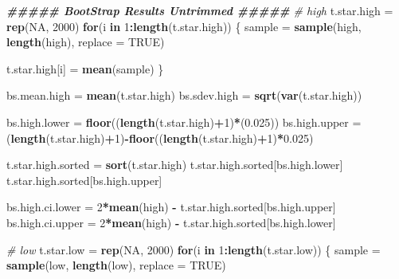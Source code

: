 \documentclass[
]{article}
\newenvironment{Shaded}{\begin{snugshade}}{\end{snugshade}}
\newcommand{\AttributeTok}[1]{\textcolor[rgb]{0.13,0.29,0.53}{#1}}
\newcommand{\CommentTok}[1]{\textcolor[rgb]{0.56,0.35,0.01}{\textit{#1}}}
\newcommand{\ConstantTok}[1]{\textcolor[rgb]{0.56,0.35,0.01}{#1}}
\newcommand{\ControlFlowTok}[1]{\textcolor[rgb]{0.13,0.29,0.53}{\textbf{#1}}}
\newcommand{\DecValTok}[1]{\textcolor[rgb]{0.00,0.00,0.81}{#1}}
\newcommand{\DocumentationTok}[1]{\textcolor[rgb]{0.56,0.35,0.01}{\textbf{\textit{#1}}}}
\newcommand{\FloatTok}[1]{\textcolor[rgb]{0.00,0.00,0.81}{#1}}
\newcommand{\FunctionTok}[1]{\textcolor[rgb]{0.13,0.29,0.53}{\textbf{#1}}}
\newcommand{\NormalTok}[1]{#1}
\newcommand{\OtherTok}[1]{\textcolor[rgb]{0.56,0.35,0.01}{#1}}
\newcommand{\SpecialCharTok}[1]{\textcolor[rgb]{0.81,0.36,0.00}{\textbf{#1}}}
\begin{document}
\begin{Shaded}
\begin{Highlighting}[]
\DocumentationTok{\#\#\#\#\# BootStrap Results Untrimmed \#\#\#\#\#}
\CommentTok{\# high}
\NormalTok{t.star.high }\OtherTok{=} \FunctionTok{rep}\NormalTok{(}\ConstantTok{NA}\NormalTok{, }\DecValTok{2000}\NormalTok{)}
\ControlFlowTok{for}\NormalTok{(i }\ControlFlowTok{in} \DecValTok{1}\SpecialCharTok{:}\FunctionTok{length}\NormalTok{(t.star.high)) \{}
\NormalTok{    sample }\OtherTok{=} \FunctionTok{sample}\NormalTok{(high, }\FunctionTok{length}\NormalTok{(high), }\AttributeTok{replace =} \ConstantTok{TRUE}\NormalTok{)}

\NormalTok{    t.star.high[i] }\OtherTok{=} \FunctionTok{mean}\NormalTok{(sample)}
\NormalTok{\}}

\NormalTok{bs.mean.high }\OtherTok{=} \FunctionTok{mean}\NormalTok{(t.star.high)}
\NormalTok{bs.sdev.high }\OtherTok{=} \FunctionTok{sqrt}\NormalTok{(}\FunctionTok{var}\NormalTok{(t.star.high))}

\NormalTok{bs.high.lower }\OtherTok{=} \FunctionTok{floor}\NormalTok{((}\FunctionTok{length}\NormalTok{(t.star.high)}\SpecialCharTok{+}\DecValTok{1}\NormalTok{)}\SpecialCharTok{*}\NormalTok{(}\FloatTok{0.025}\NormalTok{))}
\NormalTok{bs.high.upper }\OtherTok{=}\NormalTok{ (}\FunctionTok{length}\NormalTok{(t.star.high)}\SpecialCharTok{+}\DecValTok{1}\NormalTok{)}\SpecialCharTok{{-}}\FunctionTok{floor}\NormalTok{((}\FunctionTok{length}\NormalTok{(t.star.high)}\SpecialCharTok{+}\DecValTok{1}\NormalTok{)}\SpecialCharTok{*}\FloatTok{0.025}\NormalTok{)}

\NormalTok{t.star.high.sorted }\OtherTok{=} \FunctionTok{sort}\NormalTok{(t.star.high)}
\NormalTok{t.star.high.sorted[bs.high.lower]}
\NormalTok{t.star.high.sorted[bs.high.upper]}

\NormalTok{bs.high.ci.lower }\OtherTok{=} \DecValTok{2}\SpecialCharTok{*}\FunctionTok{mean}\NormalTok{(high) }\SpecialCharTok{{-}}\NormalTok{ t.star.high.sorted[bs.high.upper]}
\NormalTok{bs.high.ci.upper }\OtherTok{=} \DecValTok{2}\SpecialCharTok{*}\FunctionTok{mean}\NormalTok{(high) }\SpecialCharTok{{-}}\NormalTok{ t.star.high.sorted[bs.high.lower]}

\CommentTok{\# low}
\NormalTok{t.star.low }\OtherTok{=} \FunctionTok{rep}\NormalTok{(}\ConstantTok{NA}\NormalTok{, }\DecValTok{2000}\NormalTok{)}
\ControlFlowTok{for}\NormalTok{(i }\ControlFlowTok{in} \DecValTok{1}\SpecialCharTok{:}\FunctionTok{length}\NormalTok{(t.star.low)) \{}
\NormalTok{    sample }\OtherTok{=} \FunctionTok{sample}\NormalTok{(low, }\FunctionTok{length}\NormalTok{(low), }\AttributeTok{replace =} \ConstantTok{TRUE}\NormalTok{)}


\end{Highlighting}
\end{Shaded}
\end{document}
